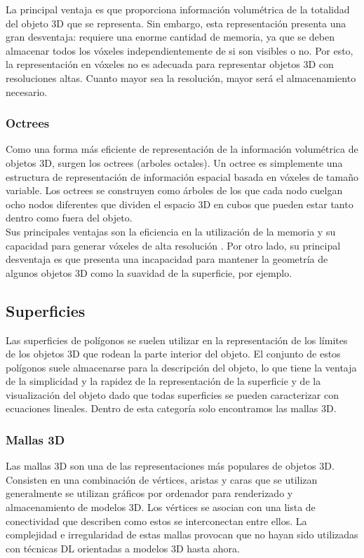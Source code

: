 La principal ventaja es que proporciona información volumétrica de la totalidad del objeto 3D que se representa. Sin embargo, esta representación presenta una gran desventaja: requiere una enorme cantidad de memoria, ya que se deben almacenar todos los vóxeles independientemente de si son visibles o no. Por esto, la representación en vóxeles no es adecuada para representar objetos 3D con resoluciones altas. Cuanto mayor sea la resolución, mayor será el almacenamiento necesario.

\subsubsection{Octrees}
Como una forma más eficiente de representación de la información volumétrica de objetos 3D, surgen los octrees (arboles octales). Un octree es simplemente una estructura de representación de información espacial basada en vóxeles de tamaño variable. Los octrees se construyen como árboles de los que cada nodo cuelgan ocho nodos diferentes \cite{tatarchenko2017octree} que dividen el espacio 3D en cubos que pueden estar tanto dentro como fuera del objeto.
\\

Sus principales ventajas son la eficiencia en la utilización de la memoria y su capacidad para generar vóxeles de alta resolución \cite{riegler2017octnet}. Por otro lado, su principal desventaja es que presenta una incapacidad para mantener la geometría de algunos objetos 3D como la suavidad de la superficie, por ejemplo.

\subsection{Superficies}
Las superficies de polígonos se suelen utilizar en la representación de los límites de los objetos 3D que rodean la parte interior del objeto. El conjunto de estos polígonos suele almacenarse para la descripción
del objeto, lo que tiene la ventaja de la simplicidad y la rapidez de la representación de la superficie y de la visualización del objeto dado que todas superficies se pueden caracterizar con ecuaciones lineales. Dentro de esta categoría solo encontramos las mallas 3D.

\subsubsection{Mallas 3D}
Las mallas 3D son una de las representaciones más populares de objetos 3D. Consisten en una combinación de vértices, aristas y caras que se utilizan generalmente se utilizan gráficos por ordenador para renderizado y almacenamiento de modelos 3D. Los vértices se asocian con una lista de conectividad que describen como estos se interconectan entre ellos. La complejidad e irregularidad de estas mallas provocan que no hayan sido utilizadas con técnicas DL orientadas a modelos 3D hasta ahora.
\\

